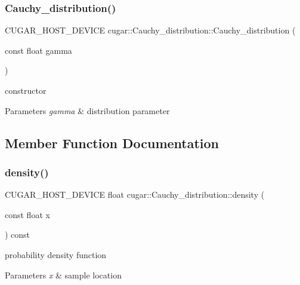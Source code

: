 \subsubsection{\texorpdfstring{Cauchy\+\_\+distribution()}{Cauchy\_distribution()}}
{\footnotesize\ttfamily C\+U\+G\+A\+R\+\_\+\+H\+O\+S\+T\+\_\+\+D\+E\+V\+I\+CE cugar\+::\+Cauchy\+\_\+distribution\+::\+Cauchy\+\_\+distribution (\begin{DoxyParamCaption}\item[{const float}]{gamma }\end{DoxyParamCaption})\hspace{0.3cm}{\ttfamily [inline]}}

constructor


\begin{DoxyParams}{Parameters}
{\em gamma} & distribution parameter \\
\hline
\end{DoxyParams}


\subsection{Member Function Documentation}
\mbox{\label{structcugar_1_1_cauchy__distribution_ae4849f807e5ed3ca0557fa9b2bea4da6}} 
\subsubsection{\texorpdfstring{density()}{density()}}
{\footnotesize\ttfamily C\+U\+G\+A\+R\+\_\+\+H\+O\+S\+T\+\_\+\+D\+E\+V\+I\+CE float cugar\+::\+Cauchy\+\_\+distribution\+::density (\begin{DoxyParamCaption}\item[{const float}]{x }\end{DoxyParamCaption}) const\hspace{0.3cm}{\ttfamily [inline]}}

probability density function


\begin{DoxyParams}{Parameters}
{\em x} & sample location \\
\hline
\end{DoxyParams}
\mbox{\label{structcugar_1_1_cauchy__distribution_a5ebb0dbebd02e247c4056c7c82466f8a}} 
